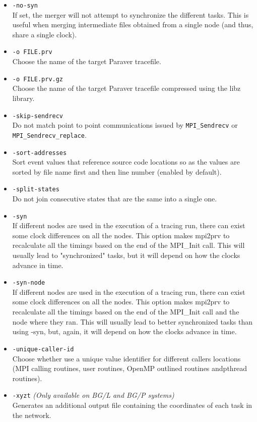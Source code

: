 \begin{itemize}
 \item {\tt -no-syn}\\
 If set, the merger will not attempt to synchronize the different tasks. This is useful when merging intermediate files obtained from a single node (and thus, share a single clock).
 \item {\tt -o FILE.prv}\\
 Choose the name of the target Paraver tracefile.
 \item {\tt -o FILE.prv.gz}\\
 Choose the name of the target Paraver tracefile compressed using the libz library.
 \item {\tt -skip-sendrecv}\\
 Do not match point to point communications issued by {\tt MPI\_Sendrecv} or {\tt MPI\_Sendrecv\_replace}.
 \item {\tt -sort-addresses}\\
 Sort event values that reference source code locations so as the values are sorted by file name first and then line number (enabled by default).
 \item {\tt -split-states}\\
 Do not join consecutive states that are the same into a single one.
 \item {\tt -syn}\\
 If different nodes are used in the execution of a tracing run, there can exist some clock differences on all the nodes. This option makes mpi2prv to recalculate all the timings based on the end of the MPI\_Init call. This will usually lead to "synchronized" tasks, but it will depend on how the clocks advance in time.
 \item {\tt -syn-node}\\
 If different nodes are used in the execution of a tracing run, there can exist some clock differences on all the nodes. This option makes mpi2prv to recalculate all the timings based on the end of the MPI\_Init call and the node where they ran. This will usually lead to better synchronized tasks than using -syn, but, again, it will depend on how the clocks advance in time.
 \item {\tt -unique-caller-id}\\
 Choose whether use a unique value identifier for different callers locations (MPI calling routines, user routines, OpenMP outlined routines andpthread routines).
 \item {\tt -xyzt} {\em (Only available on BG/L and BG/P systems)}\\
 Generates an additional output file containing the coordinates of each task in the network.
\end{itemize}

